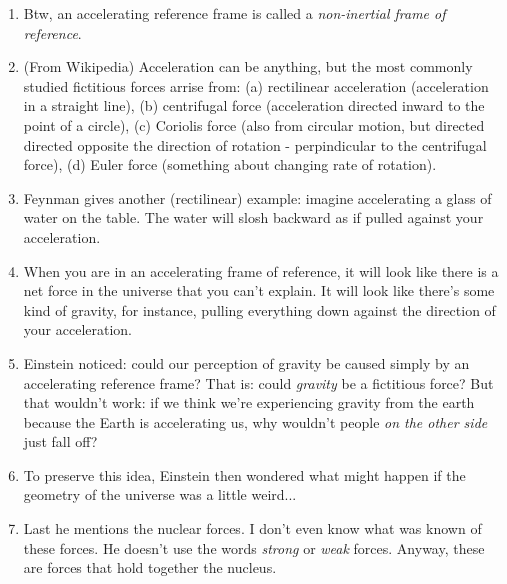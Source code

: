 \begin{enumerate}
  \item Btw, an accelerating reference frame is called a
  \emph{non-inertial frame of reference}.

  \item (From Wikipedia) Acceleration can be anything, but the most
  commonly studied fictitious forces arrise from: (a) rectilinear
  acceleration (acceleration in a straight line), (b) centrifugal force
  (acceleration directed inward to the point of a circle), (c) Coriolis
  force (also from circular motion, but directed directed opposite the
  direction of rotation - perpindicular to the centrifugal force), (d)
  Euler force (something about changing rate of rotation).

  \item Feynman gives another (rectilinear) example: imagine
  accelerating a glass of water on the table. The water will slosh
  backward as if pulled against your acceleration.

  \item When you are in an accelerating frame of reference, it will look
  like there is a net force in the universe that you can't explain. It
  will look like there's some kind of gravity, for instance, pulling
  everything down against the direction of your acceleration.

  \item Einstein noticed: could our perception of gravity be caused
  simply by an accelerating reference frame? That is: could
  \emph{gravity} be a fictitious force? But that wouldn't work: if we
  think we're experiencing gravity from the earth because the Earth is
  accelerating us, why wouldn't people \emph{on the other side} just
  fall off?

  \item To preserve this idea, Einstein then wondered what might happen
  if the geometry of the universe was a little weird...

  \item Last he mentions the nuclear forces. I don't even know what was
  known of these forces. He doesn't use the words \emph{strong} or
  \emph{weak} forces. Anyway, these are forces that hold together the
  nucleus.

\end{enumerate}

